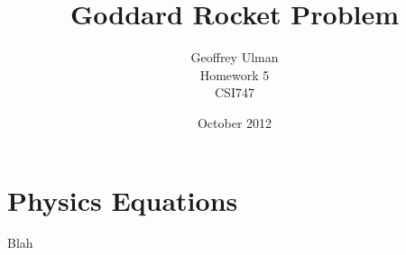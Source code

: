 \documentclass{article}
\begin{document}
\title{Goddard Rocket Problem}
\author{Geoffrey Ulman\\
        Homework 5\\
        CSI747}
\date{October 2012}
\maketitle

\section{Physics Equations}\label{Physics Equations}

Blah
\end{document}
